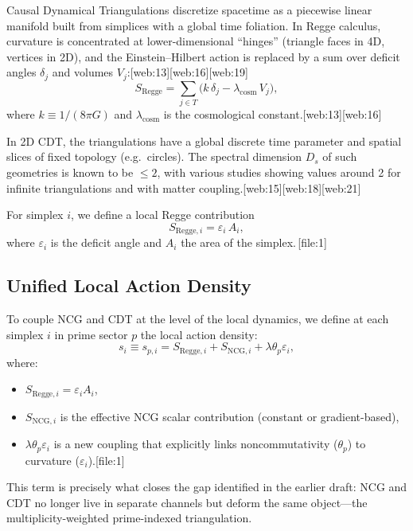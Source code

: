 \documentclass[11pt]{article}
\begin{document}
Causal Dynamical Triangulations discretize spacetime as a piecewise linear
manifold built from simplices with a global time foliation. In Regge
calculus, curvature is concentrated at lower-dimensional ``hinges''
(triangle faces in 4D, vertices in 2D), and the Einstein--Hilbert action
is replaced by a sum over deficit angles \(\delta_j\) and volumes \(V_j\):[web:13][web:16][web:19]
\begin{equation}
  S_{\mathrm{Regge}} =
    \sum_{j \in T} \bigl( k\,\delta_j - \lambda_{\mathrm{cosm}}\,V_j \bigr),
\end{equation}
where \(k \equiv 1/(8\pi G)\) and \(\lambda_{\mathrm{cosm}}\) is the
cosmological constant.[web:13][web:16]

In 2D CDT, the triangulations have a global discrete time parameter and
spatial slices of fixed topology (e.g.\ circles). The spectral dimension
\(D_s\) of such geometries is known to be \(\leq 2\), with various studies
showing values around 2 for infinite triangulations and with matter
coupling.[web:15][web:18][web:21]

For simplex \(i\), we define a local Regge contribution
\begin{equation}
  S_{\mathrm{Regge},i} =
    \varepsilon_i\,A_i,
\end{equation}
where \(\varepsilon_i\) is the deficit angle and \(A_i\) the area of the
simplex.\,[file:1]

\subsection{Unified Local Action Density}

To couple NCG and CDT at the level of the local dynamics, we define at
each simplex \(i\) in prime sector \(p\) the local action density:
\begin{equation}
  s_i \equiv s_{p,i} =
    S_{\mathrm{Regge},i}
    + S_{\mathrm{NCG},i}
    + \lambda \theta_p \varepsilon_i,
  \label{eq:local-action}
\end{equation}
where:
\begin{itemize}
  \item \(S_{\mathrm{Regge},i} = \varepsilon_i A_i\),
  \item \(S_{\mathrm{NCG},i}\) is the effective NCG scalar contribution
        (constant or gradient-based),
  \item \(\lambda \theta_p \varepsilon_i\) is a new coupling that
        explicitly links noncommutativity (\(\theta_p\)) to curvature
        (\(\varepsilon_i\)).[file:1]
\end{itemize}
This term is precisely what closes the gap identified in the earlier
draft: NCG and CDT no longer live in separate channels but deform the same
object---the multiplicity-weighted prime-indexed triangulation.
\end{document}
